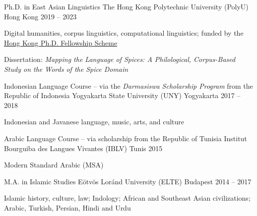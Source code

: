 
\begin{cventries}

  \cventry
    {Ph.D. in East Asian Linguistics} %
    {The Hong Kong Polytechnic University (PolyU)} %
    {Hong Kong} %
    {2019 -- 2023} %
    {
      \begin{cvitems} %
        \item {Digital humanities, corpus linguistics, computational linguistics; funded by the \href{https://cerg1.ugc.edu.hk/hkpfs/index.html}{Hong Kong Ph.D. Fellowship Scheme}}
        \item {Dissertation: \textit{Mapping the Language of Spices: A Philological, Corpus-Based Study on the Words of the Spice Domain} \href{https://partigabor.github.io/spice}{\faPaperclip}}
      \end{cvitems}
    }

  \cventry
    {Indonesian Language Course -- via the \textit{Darmasiswa Scholarship Program} from the Republic of Indonesia} %
    {Yogyakarta State University (UNY)} %
    {Yogyakarta} %
    {2017 -- 2018} %
    {
      \begin{cvitems} %
        \item {Indonesian and Javanese language, music, arts, and culture}
      \end{cvitems}
    }

  \cventry
    {Arabic Language Course -- via scholarship from the Republic of Tunisia} %
    {Institut Bourguiba des Langues Vivantes (IBLV)} %
    {Tunis} %
    {2015} %
    {
      \begin{cvitems} %
        \item {Modern Standard Arabic (MSA)}
      \end{cvitems}
    }
    
  \cventry
    {M.A. in Islamic Studies} %
    {Eötvös Loránd University (ELTE)} %
    {Budapest} %
    {2014 -- 2017} %
    {
      \begin{cvitems} %
        \item {Islamic history, culture, law; Indology; African and Southeast Asian civilizations; Arabic, Turkish, Persian, Hindi and Urdu}
      \end{cvitems}
    }


\end{cventries}
